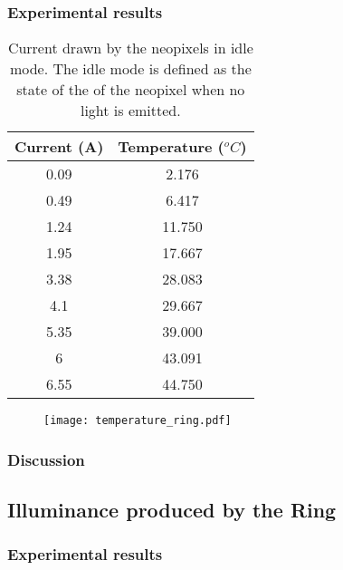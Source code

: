\subsubsection{Experimental results}

\begin{table}[h!]
	\centering
	\caption{Current drawn by the neopixels in idle mode. The idle mode is defined as the state of the of the neopixel when no light is emitted.}
	\label{table:temperature_ring}
	\begin{tabular}{cc}
		\hline
		\hline
		\toprule
		\textbf{Current (A)} & \textbf{Temperature ($^oC$)}\\
		\bottomrule
		\toprule
		0.09	&	2.176	\\
		0.49	&	6.417	\\
		1.24	&	11.750	\\
		1.95	&	17.667	\\
		3.38	&	28.083	\\
		4.1		&	29.667	\\
		5.35	&	39.000	\\
		6		&	43.091	\\
		6.55	&	44.750	\\
		\bottomrule
		\hline
		\hline
	\end{tabular}
\end{table}
\begin{figure}[ht]
	\centering
	\texttt{[image: temperature\_ring.pdf]}
	\caption{}
	\label{fig:temperature_ring}
\end{figure}

\subsubsection{Discussion}

\subsection{Illuminance produced by the Ring}
\subsubsection{Experimental results}

